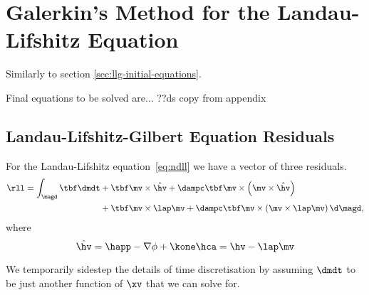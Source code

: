 
\chapter{Galerkin's Method for the Landau-Lifshitz Equation}
\label{ll-sec:galerk-meth-ll}

Similarly to section \cref{sec:llg-initial-equations}.

Final equations to be solved are... ??ds copy from appendix

\section{Landau-Lifshitz-Gilbert Equation Residuals}


For the Landau-Lifshitz equation~\eqref{eq:ndll} we have a vector of three residuals.
\begin{equation}
  \begin{aligned}
    \rll = \int_\magd \tbf \dmdt &+ \tbf \mv \times \hat{\hv}
    + \dampc \tbf \mv \times \left( \mv \times \hat{\hv} \right) \\
    &+  \tbf \mv \times \lap \mv
    + \dampc \tbf \mv \times \left(\mv \times \lap \mv\right) \d\magd,
    \label{ll-res:contllg}
  \end{aligned}
\end{equation}
where
\begin{equation}
  \hat{\hv} = \happ - \nabla \phi + \kone \hca = \hv - \lap \mv
\end{equation}

We temporarily sidestep the details of time discretisation by assuming $\dmdt$ to be just another function of $\xv$ that we can solve for.


